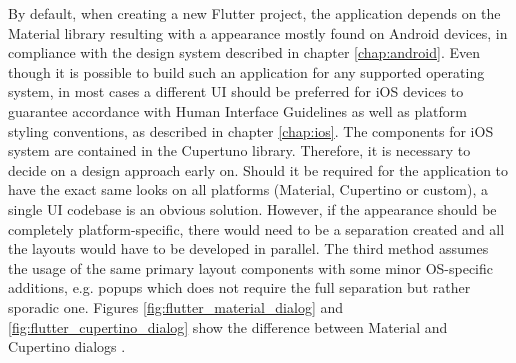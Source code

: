 By default, when creating a new Flutter project, the application depends on the Material library resulting with a appearance mostly found on Android devices, in compliance with the design system described in chapter \ref{chap:android}. Even though it is possible to build such an application for any supported operating system, in most cases a different UI should be preferred for iOS devices to guarantee accordance with Human Interface Guidelines as well as platform styling conventions, as described in chapter \ref{chap:ios}. The components for iOS system are contained in the Cupertuno library. Therefore, it is necessary to decide on a design approach early on. Should it be required for the application to have the exact same looks on all platforms (Material, Cupertino or custom), a single UI codebase is an obvious solution. However, if the appearance should be completely platform-specific, there would need to be a separation created and all the layouts would have to be developed in parallel. The third method assumes the usage of the same primary layout components with some minor OS-specific additions, e.g. popups which does not require the full separation but rather sporadic one. Figures \ref{fig:flutter_material_dialog} and \ref{fig:flutter_cupertino_dialog} show the difference between Material and Cupertino dialogs \cite{flutter_docs_architecture,kosinski_flutter_vs_rn_vs_qt}. 

